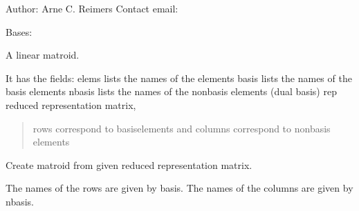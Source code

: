 \documentclass[letterpaper,12pt,english]{sphinxmanual}
\begin{document}
\sphinxAtStartPar
Author: Arne C. Reimers
Contact email: 

\begin{fulllineitems}
\label{\detokenize{api/modules:cbmpy.fluxmodules.matroid.Matroid}}
\pysigstartsignatures
\pysiglinewithargsret
{}
{\sphinxparamcomma {}\sphinxparamcomma {}}
{}
\pysigstopsignatures
\sphinxAtStartPar
Bases: 

\sphinxAtStartPar
A linear matroid.

\sphinxAtStartPar
It has the fields:
elems \sphinxhyphen{} lists the names of the elements
basis \sphinxhyphen{} lists the names of the basis elements
nbasis \sphinxhyphen{} lists the names of the non\sphinxhyphen{}basis elements (dual basis)
rep \sphinxhyphen{} reduced representation matrix,
\begin{quote}

\sphinxAtStartPar
rows correspond to basis\sphinxhyphen{}elements and
columns correspond to non\sphinxhyphen{}basis elements
\end{quote}

\begin{fulllineitems}
\label{\detokenize{api/modules:cbmpy.fluxmodules.matroid.Matroid.__init__}}
\pysigstartsignatures
\pysiglinewithargsret
{}
{\sphinxparamcomma {}\sphinxparamcomma {}}
{}
\pysigstopsignatures
\sphinxAtStartPar
Create matroid from given reduced representation matrix.

\sphinxAtStartPar
The names of the rows are given by basis. The names of the columns are given by
nbasis.

\end{fulllineitems}



\end{fulllineitems}
\end{document}
